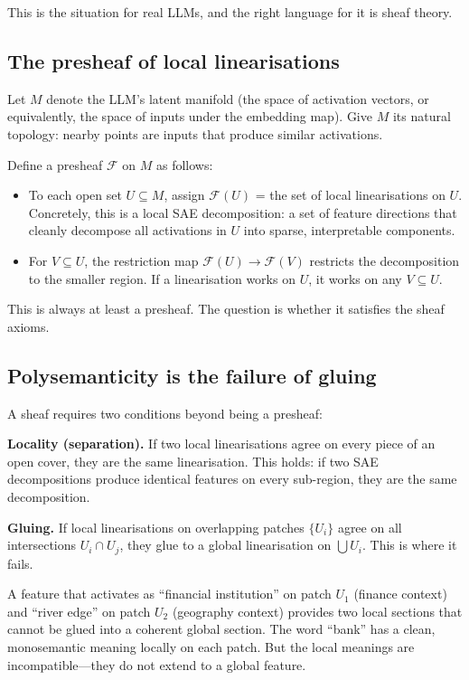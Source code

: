 \documentclass[11pt,a4paper]{article}
\begin{document}
This is the situation for real LLMs, and the right language for it is sheaf theory.

\subsection{The presheaf of local linearisations}

Let $M$ denote the LLM's latent manifold (the space of activation vectors,
or equivalently, the space of inputs under the embedding map). Give $M$ its
natural topology: nearby points are inputs that produce similar activations.

Define a presheaf $\mathcal{F}$ on $M$ as follows:
\begin{itemize}[leftmargin=*]
  \item To each open set $U \subseteq M$, assign $\mathcal{F}(U)$ = the set of
    local linearisations on $U$. Concretely, this is a local SAE decomposition:
    a set of feature directions that cleanly decompose all activations in $U$
    into sparse, interpretable components.
  \item For $V \subseteq U$, the restriction map
    $\mathcal{F}(U) \to \mathcal{F}(V)$ restricts the decomposition to the
    smaller region. If a linearisation works on $U$, it works on any $V \subseteq U$.
\end{itemize}

This is always at least a presheaf. The question is whether it satisfies the
sheaf axioms.

\subsection{Polysemanticity is the failure of gluing}

A sheaf requires two conditions beyond being a presheaf:

\textbf{Locality (separation).} If two local linearisations agree on every
piece of an open cover, they are the same linearisation. This holds: if two SAE
decompositions produce identical features on every sub-region, they are the same
decomposition.

\textbf{Gluing.} If local linearisations on overlapping patches $\{U_i\}$
agree on all intersections $U_i \cap U_j$, they glue to a global linearisation
on $\bigcup U_i$. This is where it fails.

A feature that activates as ``financial institution'' on patch $U_1$ (finance
context) and ``river edge'' on patch $U_2$ (geography context) provides two
local sections that cannot be glued into a coherent global section. The word
``bank'' has a clean, monosemantic meaning locally on each patch. But the local
meanings are incompatible---they do not extend to a global feature.
\end{document}
